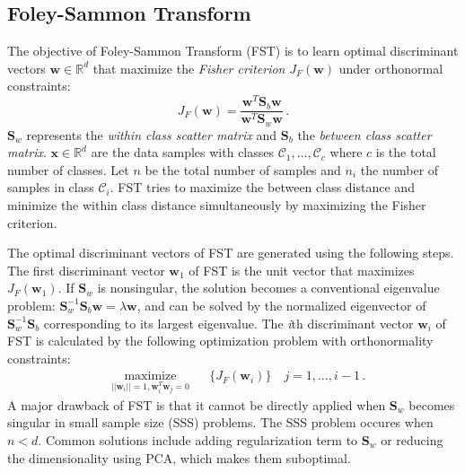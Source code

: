 \documentclass[runningheads]{llncs}
\begin{document}
\subsection{Foley-Sammon Transform}
\label{ssec:FST}
The objective of Foley-Sammon Transform (FST) \cite{sammon:odp,okada:oosda} is to learn optimal discriminant vectors $\mathbf{w} \in \mathbb{R}^{d}$ that maximize the \textit{Fisher criterion} $J_F(\mathbf{w})$ under orthonormal constraints:
\begin{equation}
\label{eqn:FC}
J_F(\mathbf{w})  = \dfrac{\mathbf{w}^T \mathbf{S}_b \mathbf{w}}{\mathbf{w}^T \mathbf{S}_w \mathbf{w}} \,.
\end{equation}
$\mathbf{S}_w$ represents the \textit{within class scatter matrix} and $\mathbf{S}_b$ the \textit{between class scatter matrix}. $\mathbf{x}\in \mathbb{R}^d$ are the data samples with classes $\mathcal{C}_1,\ldots,\mathcal{C}_c$ where $c$ is the total number of classes. Let $n$ be the total number of samples and $n_i$ the number of samples in class $\mathcal{C}_i$.
FST tries to maximize the between class distance and minimize the within class distance simultaneously by maximizing the Fisher criterion.


The optimal discriminant vectors of FST are generated using the following steps. The first discriminant vector $\mathbf{w}_{1}$ of FST is the unit vector that maximizes $J_F(\mathbf{w}_1)$.
\color{black} If $\mathbf{S}_w$ is nonsingular, the solution becomes a conventional eigenvalue problem: $\mathbf{S}_w^{-1} \mathbf{S}_b \mathbf{w} = \lambda  \mathbf{w}$, and can be solved by the normalized eigenvector of $\mathbf{S}_w^{-1} \mathbf{S}_b$ corresponding to its largest eigenvalue.
 The \textit{i}th discriminant vector $\mathbf{w}_{i}$ of FST is calculated by the following optimization problem with orthonormality constraints:
\begin{equation}
\begin{aligned}
& \underset{||\mathbf{w}_i|| = 1,\mathbf{w}_{i}^T \mathbf{w}_{j} = 0}   {\text{maximize}} & & \{J_F(\mathbf{w}_i)\} \quad j = 1, \ldots, i-1 \,.
\label{eqn:OptFST}
\end{aligned}
\end{equation}
A major drawback of FST is that it cannot be directly applied when $\mathbf{S}_w$ becomes singular in small sample size (SSS) problems. The SSS problem occures when $n<d$.
Common solutions include adding regularization term to $\mathbf{S}_w$ or reducing the dimensionality using PCA, which makes them suboptimal.
\end{document}

